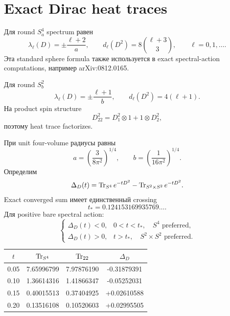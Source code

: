 \section{Exact Dirac heat traces}

Для round \(S^4_a\) spectrum равен
\begin{equation}
 \lambda_\ell(D)=\pm\frac{\ell+2}{a},
 \qquad
 d_\ell(D^2)=8\binom{\ell+3}{3},
 \qquad \ell=0,1,\ldots.
 \label{eq:s4-dirac-spectrum}
\end{equation}
Эта standard sphere formula также используется в exact spectral-action
computations, например arXiv:0812.0165.

Для round \(S^2_b\)
\begin{equation}
 \lambda_\ell(D)=\pm\frac{\ell+1}{b},
 \qquad
 d_\ell(D^2)=4(\ell+1).
\end{equation}
На product spin structure
\begin{equation}
 D_{22}^2=D_1^2\otimes1+1\otimes D_2^2,
\end{equation}
поэтому heat trace factorizes.

При unit four-volume радиусы равны
\begin{equation}
 a=\left(\frac3{8\pi^2}\right)^{1/4},
 \qquad
 b=\left(\frac1{16\pi^2}\right)^{1/4}.
\end{equation}
Определим
\begin{equation}
 \Delta_D(t)
 =\operatorname{Tr}_{S^4}e^{-tD^2}
 -\operatorname{Tr}_{S^2\times S^2}e^{-tD^2}.
\end{equation}
Exact converged sum имеет единственный crossing
\begin{equation}
 \boxed{t_*=0.124153169935769\ldots.}
 \label{eq:gaussian-dirac-crossing}
\end{equation}
Для positive bare spectral action:
\begin{equation}
 \begin{cases}
 \Delta_D(t)<0,&0<t<t_*,\quad S^4\text{ preferred},\\
 \Delta_D(t)>0,&t>t_*,\quad S^2\times S^2\text{ preferred}.
 \end{cases}
\end{equation}
\begin{center}
\begin{tabular}{c|ccc}
\(t\)&\(\operatorname{Tr}_{S^4}\)&\(\operatorname{Tr}_{22}\)&\(\Delta_D\)\\
\hline
0.05&7.65996799&7.97876190&-0.31879391\\
0.10&1.36614316&1.41866347&-0.05252031\\
0.15&0.40015513&0.37404925&+0.02610588\\
0.20&0.13516108&0.10520603&+0.02995505\\
\end{tabular}
\end{center}

